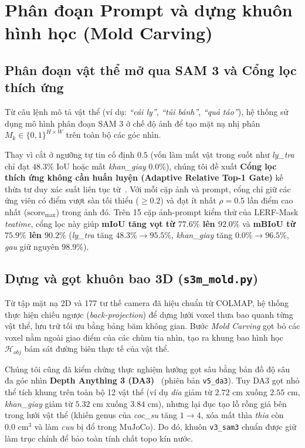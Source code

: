 \section{Phân đoạn Prompt và dựng khuôn hình học (Mold Carving)}
\subsection{Phân đoạn vật thể mở qua SAM 3 và Cổng lọc thích ứng}
Từ câu lệnh mô tả vật thể (ví dụ: \textit{``cái ly''}, \textit{``túi bánh''}, \textit{``quả táo''}), hệ thống sử dụng mô hình phân đoạn SAM 3 ở chế độ ảnh để tạo mặt nạ nhị phân $M_k \in \{0, 1\}^{H \times W}$ trên toàn bộ các góc nhìn.

Thay vì cắt ở ngưỡng tự tin cố định $0.5$ (vốn làm mất vật trong suốt như \textit{ly\_tra} chỉ đạt $48.3\%$ IoU hoặc mất \textit{khan\_giay} $0.0\%$), chúng tôi đề xuất \textbf{Cổng lọc thích ứng không cần huấn luyện (Adaptive Relative Top-1 Gate)} kế thừa tư duy xác suất liên tục từ~\cite{prob_obj_gs_2026}. Với mỗi cặp ảnh và prompt, cổng chỉ giữ các ứng viên có điểm vượt sàn tối thiểu ($\ge 0.2$) và đạt ít nhất $\rho = 0.5$ lần điểm cao nhất ($\text{score}_{\max}$) trong ảnh đó. Trên 15 cặp ảnh-prompt kiểm thử của LERF-Mask \textit{teatime}, cổng lọc này giúp \textbf{mIoU tăng vọt từ $77.6\%$ lên $92.0\%$} và \textbf{mBIoU từ $75.9\%$ lên $90.2\%$} (\textit{ly\_tra} tăng $48.3\% \to 95.5\%$, \textit{khan\_giay} tăng $0.0\% \to 96.5\%$, \textit{gau} giữ nguyên $98.9\%$).

\subsection{Dựng và gọt khuôn bao 3D (\texttt{s3m\_mold.py})}
Từ tập mặt nạ 2D và 177 tư thế camera đã hiệu chuẩn từ COLMAP, hệ thống thực hiện chiếu ngược (\textit{back-projection}) để dựng lưới voxel thưa bao quanh từng vật thể, lưu trữ tối ưu bằng bảng băm không gian. Bước \textit{Mold Carving} gọt bỏ các voxel nằm ngoài giao điểm của các chùm tia nhìn, tạo ra khung bao hình học $\mathcal{H}_{obj}$ bám sát đường biên thực tế của vật thể.

Chúng tôi cũng đã kiểm chứng thực nghiệm hướng gọt sâu bằng bản đồ độ sâu đa góc nhìn \textbf{Depth Anything 3 (DA3)}~\cite{da3_2025} (phiên bản \texttt{v5\_da3}). Tuy DA3 gọt nhỏ thể tích khung trên toàn bộ 12 vật thể (ví dụ \textit{dia} giảm từ $2.72\text{ cm}$ xuống $2.55\text{ cm}$, \textit{khan\_giay} giảm từ $5.32\text{ cm}$ xuống $3.84\text{ cm}$), nhưng lại đục tạo lỗ rỗng giả bên trong lưới vật thể (khiến genus của \textit{coc\_su} tăng $1 \to 4$, xóa mất thìa \textit{thia} còn $0.0\text{ cm}^3$ và làm \textit{cuu} bị đổ trong MuJoCo). Do đó, khuôn \texttt{v3\_sam3} chuẩn được giữ làm trục chính để bảo toàn tính chất topo kín nước.
